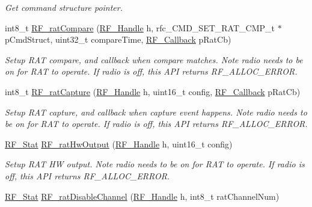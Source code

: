 \begin{DoxyCompactItemize}
\begin{DoxyCompactList}\small\item\em Get command structure pointer. \end{DoxyCompactList}\item 
int8\+\_\+t \hyperlink{_r_f_8h_a8e24e90ec802b1d85d517e2075a4d129}{R\+F\+\_\+rat\+Compare} (\hyperlink{_r_f_8h_a5e8ab7fc87fb818f435d9b6226ee573f}{R\+F\+\_\+\+Handle} h, rfc\+\_\+\+C\+M\+D\+\_\+\+S\+E\+T\+\_\+\+R\+A\+T\+\_\+\+C\+M\+P\+\_\+t $\ast$p\+Cmd\+Struct, uint32\+\_\+t compare\+Time, \hyperlink{_r_f_8h_a4d2ce6dc70b0f329dc5e249ec10c574a}{R\+F\+\_\+\+Callback} p\+Rat\+Cb)
\begin{DoxyCompactList}\small\item\em Setup R\+A\+T compare, and callback when compare matches. Note radio needs to be on for R\+A\+T to operate. If radio is off, this A\+P\+I returns R\+F\+\_\+\+A\+L\+L\+O\+C\+\_\+\+E\+R\+R\+O\+R. \end{DoxyCompactList}\item 
int8\+\_\+t \hyperlink{_r_f_8h_a68013d7c8a5a0eed8add518b30679abe}{R\+F\+\_\+rat\+Capture} (\hyperlink{_r_f_8h_a5e8ab7fc87fb818f435d9b6226ee573f}{R\+F\+\_\+\+Handle} h, uint16\+\_\+t config, \hyperlink{_r_f_8h_a4d2ce6dc70b0f329dc5e249ec10c574a}{R\+F\+\_\+\+Callback} p\+Rat\+Cb)
\begin{DoxyCompactList}\small\item\em Setup R\+A\+T capture, and callback when capture event happens. Note radio needs to be on for R\+A\+T to operate. If radio is off, this A\+P\+I returns R\+F\+\_\+\+A\+L\+L\+O\+C\+\_\+\+E\+R\+R\+O\+R. \end{DoxyCompactList}\item 
\hyperlink{_r_f_8h_afdc219ddabc8427ecd552a6c78d9988f}{R\+F\+\_\+\+Stat} \hyperlink{_r_f_8h_ad55cb257d42afee6a93016a37e7f9027}{R\+F\+\_\+rat\+Hw\+Output} (\hyperlink{_r_f_8h_a5e8ab7fc87fb818f435d9b6226ee573f}{R\+F\+\_\+\+Handle} h, uint16\+\_\+t config)
\begin{DoxyCompactList}\small\item\em Setup R\+A\+T H\+W output. Note radio needs to be on for R\+A\+T to operate. If radio is off, this A\+P\+I returns R\+F\+\_\+\+A\+L\+L\+O\+C\+\_\+\+E\+R\+R\+O\+R. \end{DoxyCompactList}\item 
\hyperlink{_r_f_8h_afdc219ddabc8427ecd552a6c78d9988f}{R\+F\+\_\+\+Stat} \hyperlink{_r_f_8h_a46e80aefad925b12066a7a94d532dc25}{R\+F\+\_\+rat\+Disable\+Channel} (\hyperlink{_r_f_8h_a5e8ab7fc87fb818f435d9b6226ee573f}{R\+F\+\_\+\+Handle} h, int8\+\_\+t rat\+Channel\+Num)

\end{DoxyCompactItemize}
